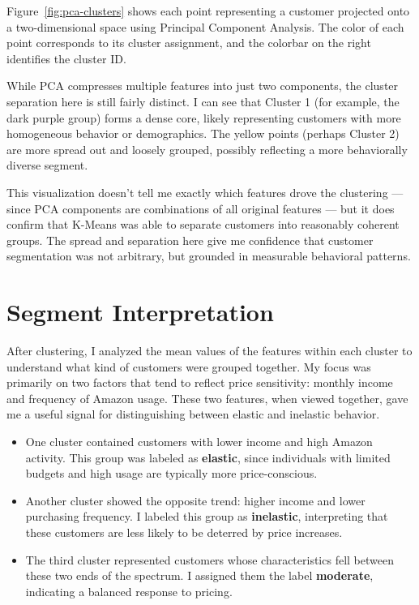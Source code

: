 \documentclass[12pt]{article}
\begin{document}
Figure~\ref{fig:pca-clusters} shows each point representing a customer projected onto a two-dimensional space using Principal Component Analysis. The color of each point corresponds to its cluster assignment, and the colorbar on the right identifies the cluster ID.

While PCA compresses multiple features into just two components, the cluster separation here is still fairly distinct. I can see that Cluster 1 (for example, the dark purple group) forms a dense core, likely representing customers with more homogeneous behavior or demographics. The yellow points (perhaps Cluster 2) are more spread out and loosely grouped, possibly reflecting a more behaviorally diverse segment.

This visualization doesn’t tell me exactly which features drove the clustering — since PCA components are combinations of all original features — but it does confirm that K-Means was able to separate customers into reasonably coherent groups. The spread and separation here give me confidence that customer segmentation was not arbitrary, but grounded in measurable behavioral patterns.


\section{Segment Interpretation}

After clustering, I analyzed the mean values of the features within each cluster to understand what kind of customers were grouped together. My focus was primarily on two factors that tend to reflect price sensitivity: monthly income and frequency of Amazon usage. These two features, when viewed together, gave me a useful signal for distinguishing between elastic and inelastic behavior.

\begin{itemize}
    \item One cluster contained customers with lower income and high Amazon activity. This group was labeled as \textbf{elastic}, since individuals with limited budgets and high usage are typically more price-conscious.
    \item Another cluster showed the opposite trend: higher income and lower purchasing frequency. I labeled this group as \textbf{inelastic}, interpreting that these customers are less likely to be deterred by price increases.
    \item The third cluster represented customers whose characteristics fell between these two ends of the spectrum. I assigned them the label \textbf{moderate}, indicating a balanced response to pricing.
\end{itemize}
\end{document}
